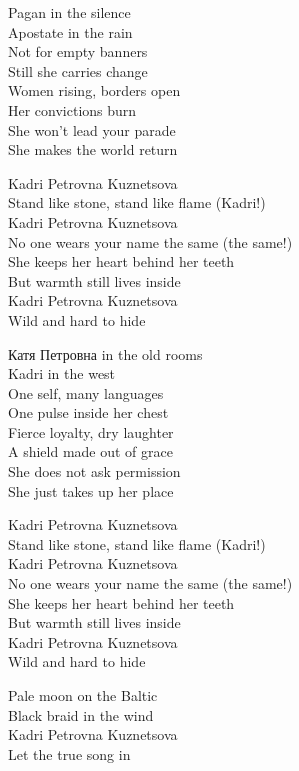 \begin{lyrics}
Pagan in the silence\\
Apostate in the rain\\
Not for empty banners\\
Still she carries change\\
Women rising, borders open\\
Her convictions burn\\
She won’t lead your parade\\
She makes the world return

Kadri Petrovna Kuznetsova\\
Stand like stone, stand like flame (Kadri!)\\
Kadri Petrovna Kuznetsova\\
No one wears your name the same (the same!)\\
She keeps her heart behind her teeth\\
But warmth still lives inside\\
Kadri Petrovna Kuznetsova\\
Wild and hard to hide

Катя Петровна in the old rooms\\
Kadri in the west\\
One self, many languages\\
One pulse inside her chest\\
Fierce loyalty, dry laughter\\
A shield made out of grace\\
She does not ask permission\\
She just takes up her place

Kadri Petrovna Kuznetsova\\
Stand like stone, stand like flame (Kadri!)\\
Kadri Petrovna Kuznetsova\\
No one wears your name the same (the same!)\\
She keeps her heart behind her teeth\\
But warmth still lives inside\\
Kadri Petrovna Kuznetsova\\
Wild and hard to hide

Pale moon on the Baltic\\
Black braid in the wind\\
Kadri Petrovna Kuznetsova\\
Let the true song in
\end{lyrics}

